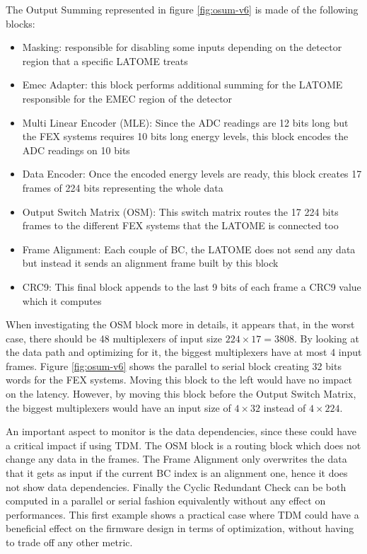 The Output Summing represented in figure \ref{fig:osum-v6} is made of the following blocks:
\begin{itemize}
    \item Masking: responsible for disabling some inputs depending on the detector region that a specific LATOME treats
    \item Emec Adapter: this block performs additional summing for the LATOME responsible for the EMEC region of the detector
    \item Multi Linear Encoder (MLE): Since the ADC readings are 12 bits long but the FEX systems requires 10 bits long energy levels, this block encodes the ADC readings on 10 bits
    \item Data Encoder: Once the encoded energy levels are ready, this block creates 17 frames of 224 bits representing the whole data
    \item Output Switch Matrix (OSM): This switch matrix routes the 17 224 bits frames to the different FEX systems that the LATOME is connected too
    \item Frame Alignment: Each couple of BC, the LATOME does not send any data but instead it sends an alignment frame built by this block
    \item CRC9: This final block appends to the last 9 bits of each frame a CRC9 value which it computes
\end{itemize}

When investigating the OSM block more in details, it appears that, in the worst case, there should be 48 multiplexers of input size \(224\times17=3808\).
By looking at the data path and optimizing for it, the biggest multiplexers have at most 4 input frames.
Figure \ref{fig:osum-v6} shows the parallel to serial block creating 32 bits words for the FEX systems. Moving this block to the left would have no impact
on the latency. However, by moving this block before the Output Switch Matrix, the biggest multiplexers would have an input size of \(4\times32\) instead of \(4\times224\).

An important aspect to monitor is the data dependencies, since these could have a critical impact if using TDM. The OSM block is a routing block which does not change any data in the frames. The Frame Alignment only overwrites the data that it gets as input if the current BC index is an alignment one, hence it does not show data dependencies. Finally the Cyclic Redundant Check can be both computed in a parallel or serial fashion equivalently without any effect on performances.
This first example shows a practical case where TDM could have a beneficial effect on the firmware design in terms of optimization, without having to trade off any other metric.

